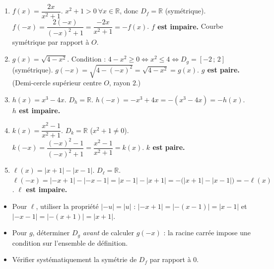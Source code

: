 \documentclass[11pt]{article}
\begin{document}
\begin{corrige}
\begin{enumerate}
    \item $f(x)=\dfrac{2x}{x^2+1}$. $x^2+1>0\ \forall x\in\mathbb{R}$, donc $D_f=\mathbb{R}$ (symétrique).
    $f(-x)=\dfrac{2(-x)}{(-x)^2+1}=\dfrac{-2x}{x^2+1}=-f(x)$. \textbf{$f$ est impaire.} Courbe symétrique par rapport à $O$.
    \item $g(x)=\sqrt{4-x^2}$. Condition : $4-x^2\ge 0 \iff x^2\le 4 \iff D_g=[-2\,;\,2]$ (symétrique).
    $g(-x)=\sqrt{4-(-x)^2}=\sqrt{4-x^2}=g(x)$. \textbf{$g$ est paire.} (Demi-cercle supérieur centre $O$, rayon $2$.)
    \item $h(x)=x^3-4x$. $D_h=\mathbb{R}$. $h(-x)=-x^3+4x=-(x^3-4x)=-h(x)$. \textbf{$h$ est impaire.}
    \item $k(x)=\dfrac{x^2-1}{x^2+1}$. $D_k=\mathbb{R}$ ($x^2+1\neq 0$).
    $k(-x)=\dfrac{(-x)^2-1}{(-x)^2+1}=\dfrac{x^2-1}{x^2+1}=k(x)$. \textbf{$k$ est paire.}
    \item $\ell(x)=|x+1|-|x-1|$. $D_\ell=\mathbb{R}$.
    $\ell(-x)=|-x+1|-|-x-1|=|x-1|-|x+1|=-\big(|x+1|-|x-1|\big)=-\ell(x)$.
    \textbf{$\ell$ est impaire.}
\end{enumerate}
\begin{attention}
\begin{itemize}
    \item Pour $\ell$, utiliser la propriété $|-u|=|u|$ : $|-x+1|=|-(x-1)|=|x-1|$ et $|-x-1|=|-(x+1)|=|x+1|$.
    \item Pour $g$, déterminer $D_g$ \emph{avant} de calculer $g(-x)$ : la racine carrée impose une condition sur l'ensemble de définition.
    \item Vérifier systématiquement la symétrie de $D_f$ par rapport à $0$.
\end{itemize}
\end{attention}
\end{corrige}
\end{document}
